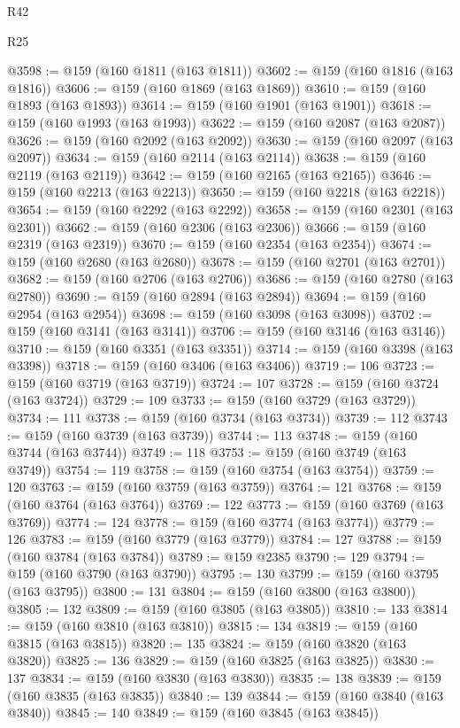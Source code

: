 \begin{lexlean}{R42}
\begin{lexlean}{R25}
\begin{coremodule}
{{{{{{{{{{{{{{{{{{{{{{{{{{{{{{{{{{{{{{{{{{{{{{{{{{{{{{{{{{{{{{{{{{{{{{{{{{{{{{{{{{{{{{{{{{{{{{{{{{{{{{{{{{{{{{{{{{{{{{{{{{{{{{{{{{{{{{{{{{{{{{{{{{{{{{{{{{{{{{{{{{{{{{{{{{{{{{{{{{{{{{{{{{{{{{{{{{{{{{{@3598 := @159 (@160 @1811 (@163 @1811))
@3602 := @159 (@160 @1816 (@163 @1816))
@3606 := @159 (@160 @1869 (@163 @1869))
@3610 := @159 (@160 @1893 (@163 @1893))
@3614 := @159 (@160 @1901 (@163 @1901))
@3618 := @159 (@160 @1993 (@163 @1993))
@3622 := @159 (@160 @2087 (@163 @2087))
@3626 := @159 (@160 @2092 (@163 @2092))
@3630 := @159 (@160 @2097 (@163 @2097))
@3634 := @159 (@160 @2114 (@163 @2114))
@3638 := @159 (@160 @2119 (@163 @2119))
@3642 := @159 (@160 @2165 (@163 @2165))
@3646 := @159 (@160 @2213 (@163 @2213))
@3650 := @159 (@160 @2218 (@163 @2218))
@3654 := @159 (@160 @2292 (@163 @2292))
@3658 := @159 (@160 @2301 (@163 @2301))
@3662 := @159 (@160 @2306 (@163 @2306))
@3666 := @159 (@160 @2319 (@163 @2319))
@3670 := @159 (@160 @2354 (@163 @2354))
@3674 := @159 (@160 @2680 (@163 @2680))
@3678 := @159 (@160 @2701 (@163 @2701))
@3682 := @159 (@160 @2706 (@163 @2706))
@3686 := @159 (@160 @2780 (@163 @2780))
@3690 := @159 (@160 @2894 (@163 @2894))
@3694 := @159 (@160 @2954 (@163 @2954))
@3698 := @159 (@160 @3098 (@163 @3098))
@3702 := @159 (@160 @3141 (@163 @3141))
@3706 := @159 (@160 @3146 (@163 @3146))
@3710 := @159 (@160 @3351 (@163 @3351))
@3714 := @159 (@160 @3398 (@163 @3398))
@3718 := @159 (@160 @3406 (@163 @3406))
@3719 := 106
@3723 := @159 (@160 @3719 (@163 @3719))
@3724 := 107
@3728 := @159 (@160 @3724 (@163 @3724))
@3729 := 109
@3733 := @159 (@160 @3729 (@163 @3729))
@3734 := 111
@3738 := @159 (@160 @3734 (@163 @3734))
@3739 := 112
@3743 := @159 (@160 @3739 (@163 @3739))
@3744 := 113
@3748 := @159 (@160 @3744 (@163 @3744))
@3749 := 118
@3753 := @159 (@160 @3749 (@163 @3749))
@3754 := 119
@3758 := @159 (@160 @3754 (@163 @3754))
@3759 := 120
@3763 := @159 (@160 @3759 (@163 @3759))
@3764 := 121
@3768 := @159 (@160 @3764 (@163 @3764))
@3769 := 122
@3773 := @159 (@160 @3769 (@163 @3769))
@3774 := 124
@3778 := @159 (@160 @3774 (@163 @3774))
@3779 := 126
@3783 := @159 (@160 @3779 (@163 @3779))
@3784 := 127
@3788 := @159 (@160 @3784 (@163 @3784))
@3789 := @159 @2385
@3790 := 129
@3794 := @159 (@160 @3790 (@163 @3790))
@3795 := 130
@3799 := @159 (@160 @3795 (@163 @3795))
@3800 := 131
@3804 := @159 (@160 @3800 (@163 @3800))
@3805 := 132
@3809 := @159 (@160 @3805 (@163 @3805))
@3810 := 133
@3814 := @159 (@160 @3810 (@163 @3810))
@3815 := 134
@3819 := @159 (@160 @3815 (@163 @3815))
@3820 := 135
@3824 := @159 (@160 @3820 (@163 @3820))
@3825 := 136
@3829 := @159 (@160 @3825 (@163 @3825))
@3830 := 137
@3834 := @159 (@160 @3830 (@163 @3830))
@3835 := 138
@3839 := @159 (@160 @3835 (@163 @3835))
@3840 := 139
@3844 := @159 (@160 @3840 (@163 @3840))
@3845 := 140
@3849 := @159 (@160 @3845 (@163 @3845))
}}}}}}}}}}}}}}}}}}}}}}}}}}}}}}}}}}}}}}}}}}}}}}}}}}}}}}}}}}}}}}}}}}}}}}}}}}}}}}}}}}}}}}}}}}}}}}}}}}}}}}}}}}}}}}}}}}}}}}}}}}}}}}}}}}}}}}}}}}}}}}}}}}}}}}}}}}}}}}}}}}}}}}}}}}}}}}}}}}}}}}}}}}}}}}}}}}}}}}}
\end{coremodule}
\end{lexlean}
\end{lexlean}
